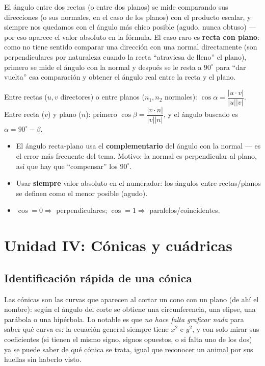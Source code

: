 \documentclass[11pt,a4paper]{article}
\begin{document}
\begin{intuicion}
El ángulo entre dos rectas (o entre dos planos) se mide comparando sus direcciones (o sus
normales, en el caso de los planos) con el producto escalar, y siempre nos quedamos con
el ángulo más chico posible (agudo, nunca obtuso) — por eso aparece el valor absoluto en
la fórmula. El caso raro es \textbf{recta con plano}: como no tiene sentido comparar una
dirección con una normal directamente (son perpendiculares por naturaleza cuando la recta
``atraviesa de lleno'' el plano), primero se mide el ángulo con la normal y después se le
resta a $90^\circ$ para ``dar vuelta'' esa comparación y obtener el ángulo real entre la
recta y el plano.
\end{intuicion}

\begin{teoria}[Fórmulas]
Entre rectas ($u,v$ directores) o entre planos ($n_1,n_2$ normales):
$\cos\alpha=\dfrac{|u\cdot v|}{|u||v|}$. Entre recta ($v$) y plano ($n$): primero
$\cos\beta=\dfrac{|v\cdot n|}{|v||n|}$, y el ángulo buscado es
$\boxed{\alpha=90^\circ-\beta}$.
\end{teoria}

\begin{atencion}
\begin{itemize}
    \item El ángulo recta-plano usa el \textbf{complementario} del ángulo con la normal —
    es el error más frecuente del tema. Motivo: la normal es perpendicular al plano, así
    que hay que ``compensar'' los $90^\circ$.
    \item Usar \textbf{siempre} valor absoluto en el numerador: los ángulos entre
    rectas/planos se definen como el menor posible (agudo).
    \item $\cos=0\Rightarrow$ perpendiculares; $\cos=1\Rightarrow$ paralelos/coincidentes.
\end{itemize}
\end{atencion}

\newpage
\section{Unidad IV: Cónicas y cuádricas}

\subsection{Identificación rápida de una cónica}

\begin{intuicion}
Las cónicas son las curvas que aparecen al cortar un cono con un plano (de ahí el
nombre): según el ángulo del corte se obtiene una circunferencia, una elipse, una
parábola o una hipérbola. Lo notable es que \emph{no hace falta graficar nada} para saber
qué curva es: la ecuación general siempre tiene $x^2$ e $y^2$, y con solo mirar sus
coeficientes (si tienen el mismo signo, signos opuestos, o si falta uno de los dos) ya se
puede saber de qué cónica se trata, igual que reconocer un animal por sus huellas sin
haberlo visto.
\end{intuicion}
\end{document}

